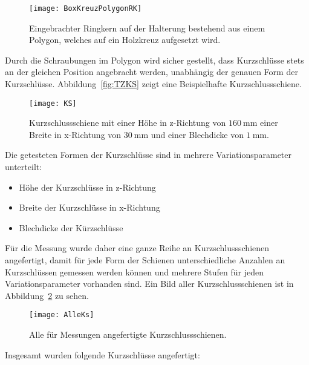 \begin{figure}[htb]
	\centering
	\texttt{[image: BoxKreuzPolygonRK]}
	\caption{Eingebrachter Ringkern auf der Halterung bestehend aus einem Polygon, welches auf ein Holzkreuz aufgesetzt wird.}
	\label{fig:BoxKreuzPolygonRK}
\end{figure}
Durch die Schraubungen im Polygon wird sicher gestellt, dass Kurzschl\"usse stets an der gleichen Position angebracht werden, unabh\"angig der genauen Form der Kurzschl\"usse. Abbildung~\ref{fig:TZKS} zeigt eine Beispielhafte Kurzschlussschiene.
\par
\begin{figure}[htb]
	\centering
	\texttt{[image: KS]}
	\caption{Kurzschlussschiene mit einer H\"ohe in z-Richtung von $\SI{160}{\milli\meter}$ einer Breite in x-Richtung von $\SI{30}{\milli\meter}$ und einer Blechdicke von $\SI{1}{\milli\meter}$.}
\end{figure}
Die getesteten Formen der Kurzschl\"usse sind in mehrere Variationsparameter unterteilt:
\begin{itemize}
	\item H\"ohe der Kurzschl\"usse in z-Richtung
	\item Breite der Kurzschl\"usse in x-Richtung
	\item Blechdicke der K\"urzschl\"usse
\end{itemize}
\par
F\"ur die Messung wurde daher eine ganze Reihe an Kurzschlussschienen angefertigt, damit f\"ur jede Form der Schienen unterschiedliche Anzahlen an Kurzschl\"ussen gemessen werden k\"onnen und mehrere Stufen f\"ur jeden Variationsparameter vorhanden sind. Ein Bild aller Kurzschlussschienen ist in Abbildung~\ref{fig:AlleKs} zu sehen.
\par
\begin{figure}[htb]
	\centering
	\texttt{[image: AlleKs]}
	\caption{Alle f\"ur Messungen angefertigte Kurzschlussschienen.}
	\label{fig:AlleKs}
\end{figure}
Insgesamt wurden folgende Kurzschl\"usse angefertigt:
\par
